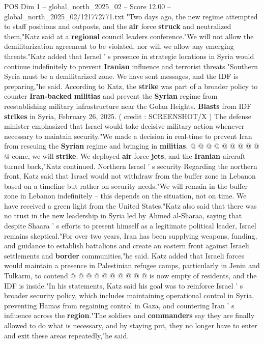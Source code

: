 \begin{textsample}{POS Dim 1 – global\_north\_2025\_02 – Score 12.00 – global\_north\_2025\_02/121772771.txt}  \label{ex:f1_pos_440}
"Two days ago, the new regime attempted to staff positions and outposts, and the \textbf{air} force \textbf{struck} and neutralized them,"Katz said at a \textbf{regional} council leaders conference."We will not allow the demilitarization agreement to be violated, nor will we allow any emerging threats."Katz added that Israel ' s presence in strategic locations in Syria would continue indefinitely to prevent \textbf{Iranian} influence and terrorist threats."Southern Syria must be a demilitarized zone.
We have sent messages, and the IDF is preparing,"he said.
According to Katz, the \textbf{strike} was part of a broader policy to counter \textbf{Iran-backed} \textbf{militias} and prevent the \textbf{Syrian} regime from reestablishing military infrastructure near the Golan Heights. \textbf{Blasts} from IDF \textbf{strikes} in Syria, February 26, 2025. ( credit : SCREENSHOT/X ) The defense minister emphasized that Israel would take decisive military action whenever necessary to maintain security."We made a decision in real-time to prevent Iran from rescuing the \textbf{Syrian} regime and bringing in \textbf{militias}. @ @ @ @ @ @ @ @ @ @ come, we will \textbf{strike}.
We deployed \textbf{air} force \textbf{jets}, and the \textbf{Iranian} aircraft turned back,"Katz continued.
Northern Israel ' s security Regarding the northern front, Katz said that Israel would not withdraw from the buffer zone in Lebanon based on a timeline but rather on security needs."We will remain in the buffer zone in Lebanon indefinitely -- this depends on the situation, not on time.
We have received a green light from the United States."Katz also said that there was no trust in the new leadership in Syria led by Ahmed al-Sharaa, saying that despite Shaara ' s efforts to present himself as a legitimate political leader, Israel remains skeptical."For over two years, Iran has been supplying weapons, funding, and guidance to establish battalions and create an eastern front against Israeli settlements and \textbf{border} communities,"he said.
Katz added that Israeli forces would maintain a presence in Palestinian refugee camps, particularly in Jenin and Tulkarm, to contend @ @ @ @ @ @ @ @ @ @ is now empty of residents, and the IDF is inside."In his statements, Katz said his goal was to reinforce Israel ' s broader security policy, which includes maintaining operational control in Syria, preventing Hamas from regaining control in Gaza, and countering Iran ' s influence across the \textbf{region}."The soldiers and \textbf{commanders} say they are finally allowed to do what is necessary, and by staying put, they no longer have to enter and exit these areas repeatedly,"he said.

\end{textsample}
